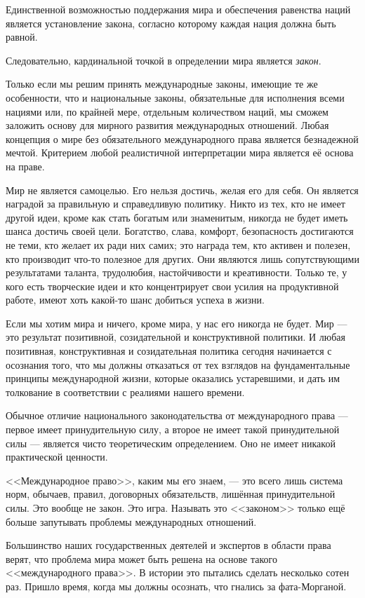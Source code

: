 Единственной возможностью поддержания мира и обеспечения равенства наций является установление закона, согласно которому каждая нация должна быть равной.

Следовательно, кардинальной точкой в определении мира является \textit{закон}.

Только если мы решим принять международные законы, имеющие те же особенности, что и национальные законы, обязательные для исполнения всеми нациями или, по крайней мере, отдельным количеством наций, мы сможем заложить основу для мирного развития международных отношений. Любая концепция о  мире без обязательного международного права является безнадежной мечтой. Критерием любой реалистичной интерпретации мира является её основа на праве.

Мир не является самоцелью. Его нельзя достичь, желая его для себя. Он является наградой за правильную и справедливую политику. Никто из тех, кто не имеет другой идеи, кроме как стать богатым или знаменитым, никогда не будет иметь шанса достичь своей цели. Богатство, слава, комфорт, безопасность достигаются не теми, кто желает их ради них самих; это награда тем, кто активен и полезен, кто производит что-то полезное для других. Они являются лишь сопутствующими результатами таланта, трудолюбия, настойчивости и креативности. Только те, у кого есть творческие идеи и кто концентрирует свои усилия на продуктивной работе, имеют хоть какой-то шанс добиться успеха в жизни.

Если мы хотим мира и ничего, кроме мира, у нас его никогда не будет. Мир — это результат позитивной, созидательной и конструктивной политики. И любая позитивная, конструктивная и созидательная политика сегодня начинается с осознания того, что мы должны отказаться от тех взглядов на фундаментальные принципы международной жизни, которые оказались устаревшими, и дать им толкование в соответствии с реалиями нашего времени.

Обычное отличие национального законодательства от международного права — первое имеет принудительную силу, а второе не имеет такой принудительной силы — является чисто теоретическим определением. Оно не имеет никакой практической ценности.

<<Международное право>>, каким мы его знаем, — это всего лишь система норм, обычаев, правил, договорных обязательств, лишённая принудительной силы. Это вообще не закон. Это игра. Называть это <<законом>> только ещё больше запутывать проблемы международных отношений.

Большинство наших государственных деятелей и экспертов в области права верят, что проблема мира может быть решена на основе такого <<международного права>>. В истории это пытались сделать несколько сотен раз. Пришло время, когда мы должны осознать, что гнались за фата-Морганой.

